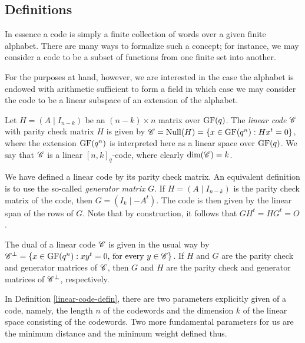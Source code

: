 \documentclass[../../../main]{subfiles}
\begin{document}
\subsection{Definitions}

In essence a code is simply a finite collection of words over a given finite
alphabet. There are many ways to formalize such a concept; for instance, we may
consider a code to be a subset of functions from one finite set into another.

For the purposes at hand, however, we are interested in the case the alphabet is
endowed with arithmetic sufficient to form a field in which case we may consider
the code to be a linear subspace of an extension of the alphabet.

\begin{defin}\label{linear-code-defin}
 Let $H=(A \mid I_{n-k})$ be an $(n-k) \times n$ matrix over $\text{GF}(q)$. The {\it linear code} $\mathscr{C}$ with parity check matrix $H$ is given by $\mathscr{C} = \text{Null}(H) = \{x \in \text{GF}(q^n) : Hx^t = 0\}$, where the extension $\text{GF}(q^n)$ is interpreted here as a linear space over $\text{GF}(q)$. We say that $\mathscr{C}$ is a linear $[n,k]_q$-code, where clearly $\text{dim}(\mathscr{C}) = k$.
\end{defin}

We have defined a linear code by its parity check matrix. An equivalent definition is to use the so-called {\it generator matrix} $G$. If $H=(A \mid I_{n-k})$ is the parity check matrix of the code, then $G=(I_k \mid -A^t)$. The code is then given by the linear span of the rows of $G$. Note that by construction, it follows that $GH^t = HG^t = O$.

The dual of a linear code $\mathscr{C}$ is given in the usual way by $\mathscr{C}^\perp = \{x \in \text{GF}(q^n) : xy^t=0 \text{, for every }y\in\mathscr{C}\}$. If $H$ and $G$ are the parity check and generator matrices of $\mathscr{C}$, then $G$ and $H$ are the parity check and generator matrices of $\mathscr{C}^\perp$, respectively.

In Definition \ref{linear-code-defin}, there are two parameters explicitly given of a code, namely, the length $n$ of the codewords and the dimension $k$ of the linear space consisting of the codewords. Two more fundamental parameters for us are the minimum distance and the minimum weight defined thus.
\end{document}
